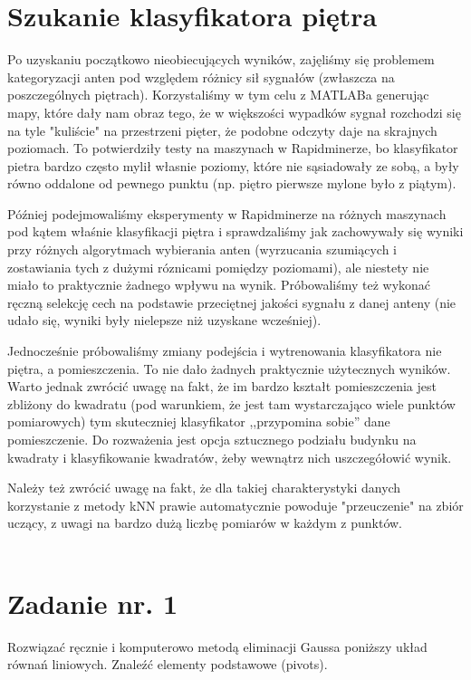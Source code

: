 \documentclass{article}
\begin{document}
\section{Szukanie klasyfikatora piętra}
Po uzyskaniu początkowo nieobiecujących wyników, zajęliśmy się problemem kategoryzacji anten pod względem różnicy sił sygnałów (zwłaszcza na poszczególnych piętrach). Korzystaliśmy w tym celu z MATLABa generując mapy, które dały nam obraz tego, że w większości wypadków sygnał rozchodzi się na tyle "kuliście" na przestrzeni pięter, że podobne odczyty daje na skrajnych poziomach. To potwierdziły testy na maszynach w Rapidminerze, bo klasyfikator pietra bardzo często mylił własnie poziomy, które nie sąsiadowały ze sobą, a były równo oddalone od pewnego punktu (np. piętro pierwsze mylone było z piątym).

Później podejmowaliśmy eksperymenty w Rapidminerze na różnych maszynach pod kątem właśnie klasyfikacji piętra i sprawdzaliśmy jak zachowywały się wyniki przy różnych algorytmach wybierania anten (wyrzucania szumiących i zostawiania tych z dużymi róznicami pomiędzy poziomami), ale niestety nie miało to praktycznie żadnego wpływu na wynik. Próbowaliśmy też wykonać ręczną selekcję cech na podstawie przeciętnej jakości sygnału z danej anteny (nie udało się, wyniki były nielepsze niż uzyskane wcześniej).

Jednocześnie próbowaliśmy zmiany podejścia i wytrenowania klasyfikatora nie piętra, a pomieszczenia. To nie dało żadnych praktycznie użytecznych wyników. Warto jednak zwrócić uwagę na fakt, że im bardzo kształt pomieszczenia jest zbliżony do kwadratu (pod warunkiem, że jest tam wystarczająco wiele punktów pomiarowych) tym skuteczniej klasyfikator ,,przypomina sobie'' dane pomieszczenie. Do rozważenia jest opcja sztucznego podziału budynku na kwadraty i klasyfikowanie kwadratów, żeby wewnątrz nich uszczegółowić wynik.

Należy też zwrócić uwagę na fakt, że dla takiej charakterystyki danych korzystanie z metody kNN prawie automatycznie powoduje "przeuczenie" na zbiór uczący, z uwagi na bardzo dużą liczbę pomiarów w każdym z punktów.
\\
\\
\section{Zadanie nr. 1}
Rozwiązać ręcznie i komputerowo metodą eliminacji Gaussa poniższy układ równań
liniowych. Znaleźć elementy podstawowe (pivots).
\end{document}
